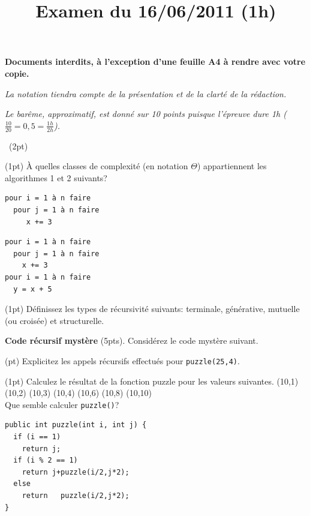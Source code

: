 \documentclass[10pt]{article}\usepackage[nu]{esial}
\begin{document}
\title{Examen du 16/06/2011 (1h)}
\maketitle\vspace{-\baselineskip}

\begin{center}
  \textbf{\large Documents interdits, à l'exception d'une feuille A4 à rendre
    avec votre copie.}

  \noindent\textit{La notation tiendra compte de la présentation et de la
    clarté de la rédaction.}

  \textit{Le barême, approximatif, est donné sur 10 points puisque l'épreuve
    dure 1h ($\frac{10}{20}=0,5=\frac{1h}{2h}$).}
\end{center}\vspace{-\baselineskip}


\bigskip\QuestionCours~(2pt)

\Question(1pt) À quelles classes de complexité (en notation
$\Theta$) appartiennent les algorithmes 1 et 2 suivants?

\medskip\noindent\begin{minipage}{.45\linewidth}
  \begin{Verbatim}[label=algorithme 1]
pour i = 1 à n faire
  pour j = 1 à n faire
     x += 3    
  \end{Verbatim}
\end{minipage}\hfill\begin{minipage}{.45\linewidth}
  \begin{Verbatim}[label=algorithme 2]
pour i = 1 à n faire
  pour j = 1 à n faire
    x += 3
pour i = 1 à n faire
  y = x + 5
  \end{Verbatim}
\end{minipage}

\Question(1pt) Définissez les types de récursivité suivants: terminale,
générative, mutuelle (ou croisée) et structurelle.

\medskip\Exercice\textbf{Code récursif mystère} (5pts). 
Considérez le code mystère suivant. 

\noindent\begin{minipage}{.65\linewidth}

\Question(\textonehalf pt) Explicitez les appels récursifs effectués pour 
\texttt{puzzle(25,4)}. 

\Question(1pt) Calculez le résultat de la fonction puzzle pour les valeurs
suivantes. 
(10,1) (10,2) (10,3) (10,4) (10,6) (10,8) (10,10)\\
Que semble calculer \texttt{puzzle()}? 

\end{minipage}\hfill
\begin{minipage}{.33\linewidth}
\begin{Verbatim}[numbers=right]
public int puzzle(int i, int j) {
  if (i == 1)     
    return j;
  if (i % 2 == 1)
    return j+puzzle(i/2,j*2);
  else 
    return   puzzle(i/2,j*2);
}
\end{Verbatim}
\end{minipage}
\end{document}
